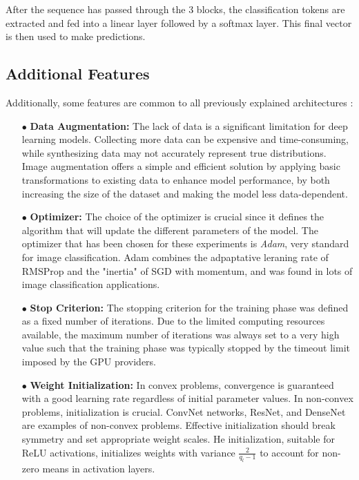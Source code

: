 \documentclass[twocolumn,superscriptaddress,aps]{revtex4-1}
\begin{document}
After the sequence has passed through the 3 blocks, the classification tokens are extracted and fed into a linear layer followed by a softmax layer. This final vector is then used to make predictions.

\subsection{Additional Features}

Additionally, some features are common to all previously explained architectures : 

\begin{itemize}
    \item[$\bullet$] \textbf{Data Augmentation:} The lack of data is a significant limitation for deep learning models. Collecting more data can be expensive and time-consuming, while synthesizing data may not accurately represent true distributions. Image augmentation offers a simple and efficient solution by applying basic transformations to existing data to enhance model performance, by both increasing the size of the dataset and making the model less data-dependent. 

    \item [$\bullet$] \textbf{Optimizer:} The choice of the optimizer is crucial since it defines the algorithm that will update the different parameters of the model. The optimizer that has been chosen for these experiments is \textit{Adam}, very standard for image classification. Adam combines the adpaptative leraning rate of RMSProp and the "inertia" of SGD with momentum, and was found in lots of image classification applications. 

    \item [$\bullet$] \textbf{Stop Criterion:} The stopping criterion for the training phase was defined as a fixed number of iterations. Due to the limited computing resources available, the maximum number of iterations was always set to a very high value such that the training phase was typically stopped by the timeout limit imposed by the GPU providers.

    \item[$\bullet$] \textbf{Weight Initialization:} In convex problems, convergence is guaranteed with a good learning rate regardless of initial parameter values. In non-convex problems, initialization is crucial. ConvNet networks, ResNet, and DenseNet are examples of non-convex problems. Effective initialization should break symmetry and set appropriate weight scales. He initialization, suitable for ReLU activations, initializes weights with variance $\frac{2}{q_l-1}$ to account for non-zero means in activation layers.


\end{itemize}
\end{document}

